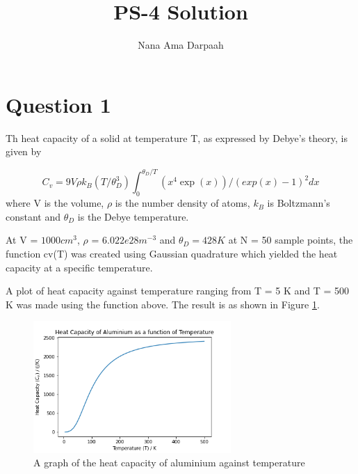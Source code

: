 \documentclass[11pt]{article}
\title{PS-4 Solution}
\author{Nana Ama Darpaah}
\begin{document}
	\maketitle
	
\section{Question 1}
Th heat capacity of a solid at temperature T, as expressed by Debye's theory, is given by

\begin{equation}
	C_{v} = 9V\rho k_{B}(T/\theta_{D}^{3})\int_{0}^{\theta_{D}/T}(x^{4}\exp(x))/(exp(x)-1)^{2} dx
\end{equation}
where V is the volume, $\rho$ is the number density of atoms, $k_{B}$ is Boltzmann's constant and $\theta_{D}$ is the Debye temperature.

At V = $1000 cm^{3}$,  $\rho$ = $6.022e28 m^{-3}$ and $\theta_{D} = 428 K$ at N = 50 sample points, the function cv(T) was created using Gaussian quadrature which yielded the heat capacity at a specific temperature.

A plot of heat capacity against temperature ranging from T = 5 K and T = 500 K was made using the function above. The result is as shown in Figure \ref{fig:heat_capacity}.
\begin{figure}[h]\begin{center} 
		\vspace{12pt}
		\includegraphics[width=0.67\textwidth]{heat_capacity.png} 
		\caption{A graph of the heat capacity of aluminium against temperature }
		\label{fig:heat_capacity}
	\end{center}
\end{figure} 
	
\end{document}
